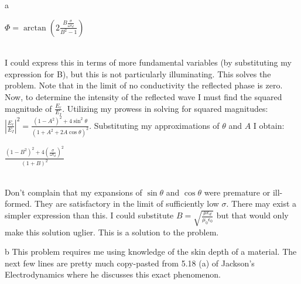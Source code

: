 \begin{homeworkProblem}
\begin{homeworkSection}{a}
\begin{problemAnswer}{$\Phi = \arctan(2\frac{B \frac{\sigma}{\omega \epsilon_d}}{B^2-1})$}\end{problemAnswer}
\\

I could express this in terms of more fundamental variables (by substituting my expression for B), but this is not particularly illuminating. This solves the problem. Note that in the limit of no conductivity the reflected phase is zero.
\\

Now, to determine the intensity of the reflected wave I must find the squared magnitude of $\frac{E_r}{E_I}$. Utilizing my prowess in solving for squared magnitudes: $|\frac{E_r}{E_I}|^2 = \frac{(1-A^2)^2+4\sin^2\theta}{(1+A^2+2A\cos\theta)^2}$. Substituting my approximations of $\theta$ and $A$ I obtain: 
\\

\begin{problemAnswer}{$ \frac{(1-B^2)^2+4(\frac{\sigma}{\omega \epsilon_d})^2}{(1+B)^2}$}\end{problemAnswer}
\\

Don't complain that my expansions of $\sin\theta$ and $\cos\theta$ were premature or ill-formed. They are satisfactory in the limit of sufficiently low $\sigma$. There may exist a simpler expression than this. I could substitute $B = \sqrt{\frac{\mu\epsilon_d}{\mu_0 \epsilon_0}}$ but that would only make this solution uglier. This is a solution to the problem. 

\end{homeworkSection}

\begin{homeworkSection}{b}
This problem requires me using knowledge of the skin depth of a material. The next few lines are pretty much copy-pasted from 5.18 (a) of Jackson's Electrodynamics where he discusses this exact phenomenon.
\\


\end{homeworkSection}
\end{homeworkProblem}
